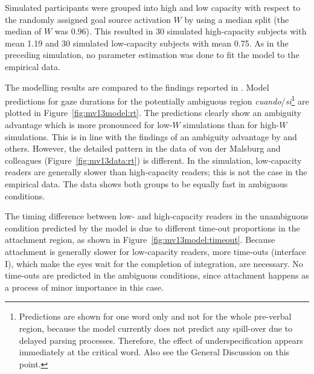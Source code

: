 \documentclass{cambridge7A}\usepackage[]{graphicx}\usepackage[]{color}
\begin{document}
Simulated participants were grouped into high and low capacity with respect to the randomly assigned goal source activation $W$ by using a median split (the median of $W$ was 0.96).
This resulted in $30$ simulated high-capacity subjects with mean 1.19 and $30$ simulated low-capacity subjects with mean 0.75.
As in the preceding simulation, no parameter estimation was done to fit the model to the empirical data. 

The modelling results are compared to the findings reported in \cite{MalsburgVasishth2013}. Model predictions for gaze durations for the potentially ambiguous region \textit{cuando}/\textit{si}\footnote{Predictions are shown for one word only and not for the whole pre-verbal region, because the model currently does not predict any spill-over due to delayed parsing processes. Therefore, the effect of underspecification appears immediately at the critical word. Also see the General Discussion on this point.} 
are plotted in Figure~\ref{fig:mv13model:rt}. The predictions clearly show an ambiguity advantage which is more pronounced for low-$W$ simulations than for high-$W$ simulations. This is in line with the findings of an ambiguity advantage by \cite{MalsburgVasishth2013} and others. However, the detailed pattern in the data of von der Malsburg and colleagues (Figure~\ref{fig:mv13data:rt}) is different. In the simulation, low-capacity readers are generally slower than high-capacity readers; this is not the case in the empirical data. The data shows both groups to be equally fast in ambiguous conditions.

The timing difference between low- and high-capacity readers in the unambiguous condition predicted by the model is due to different time-out proportions in the attachment region, as shown in Figure~\ref{fig:mv13model:timeout}. Because attachment is generally slower for low-capacity readers, more time-outs (interface I), which make the eyes wait for the completion of integration, are necessary. No time-outs are predicted in the ambiguous conditions, since attachment happens as a process of minor importance in this case.
\end{document}

